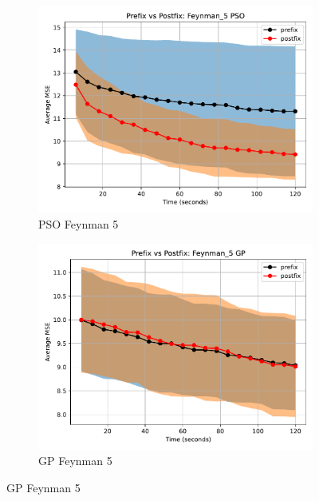 \documentclass[runningheads]{llncs}
\begin{document}
\begin{figure}
    \vspace{0.5cm}
    
    \begin{subfigure}[b]{0.4\textwidth}
        \includegraphics[width=\linewidth, keepaspectratio]{AIFeynman_Benchmarks/PrePostFeynman_5PSO.pdf}
        \caption{PSO Feynman 5}
        \label{subfig:feynman_5_PSO}
    \end{subfigure}
    \begin{subfigure}[b]{0.4\textwidth}
        \includegraphics[width=\linewidth, keepaspectratio]{AIFeynman_Benchmarks/PrePostFeynman_5GP.pdf}
        \caption{GP Feynman 5}
        \label{subfig:feynman_5_GP}
    \end{subfigure}
    

\end{figure}
\end{document}
